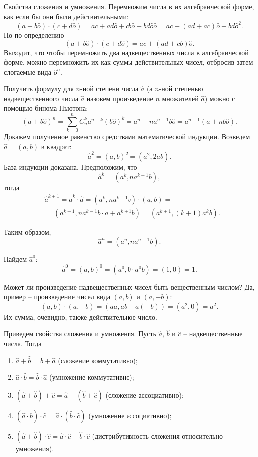 \b{Свойства сложения и умножения.} Перемножим числа в их алгебраической форме, как если бы они были действительными:
	$$(a+b\hat{o})\cdot(c+d\hat{o})=ac+ad\hat{o}+cb\hat{o}+bd\hat{o}\hat{o}=ac+(ad+ac)\hat{o}+bd\hat{o}^2.$$
Но по определению
	$$(a+b\hat{o})\cdot(c+d\hat{o})=ac+(ad+cb)\hat{o}.$$
Выходит, что чтобы перемножить два надвещественных числа в алгебраической форме, можно перемножить их как суммы действительных чисел, отбросив затем слогаемые вида $\hat{o}^n$.
\begin{example} Получить формулу для $n$-ной степени числа $\hat{a}$  (а $n$-ной степенью надвещественного числа $\hat{a}$ назовем произведение $n$ множителей $\hat{a}$) можно с помощью бинома Ньютона:
	$$(a+b\hat{o})^n=\sum_{k=0}^n C_n^k a^{n-k} (b\hat{o})^k=a^n+na^{n-1}b\hat{o}=a^{n-1}(a+nb\hat{o}).$$
Докажем полученное равенство средствами математической индукции. Возведем $\hat{a}=(a, b)$ в квадрат:
	$$\hat{a}^2=(a, b)^2=(a^2, 2ab).$$
База индукции доказана. Предположим, что
	$$\hat{a}^k=(a^k, na^{k-1}b),$$
тогда
	\begin{eqnarray*}
	& \hat{a}^{k+1}=\hat{a}^k\cdot\hat{a}=(a^k, na^{k-1}b)\cdot(a, b)= \\
	& = (a^{k+1}, na^{k-1}b\cdot a+a^{k+1}b)=(a^{k+1}, (k+1)a^kb).
	\end{eqnarray*}
\end{example}
Таким образом,
\begin{equation}\label{eq:npower}
	\hat{a}^n=(a^n, na^{n-1}b).
\end{equation}
\begin{example}
	Найдем $\hat{a}^0$:
		$$\hat{a}^0=(a, b)^0=(a^0, 0\cdot a^0b)=(1, 0)=1.$$
\end{example}
\begin{example} Может ли произведение надвещественных чисел быть вещественным числом? Да, пример -- произведение чисел вида $(a, b)$ и $(a, -b)$:
	$$(a, b)\cdot(a, -b)=(aa, ab+a(-b))=(a^2, 0)=a^2.$$
Их сумма, очевидно, также действительное число.
\end{example}
Приведем свойства сложения и умножения. Пусть $\hat{a}$, $\hat{b}$ и $\hat{c}$ -- надвещественные числа. Тогда
\begin{enumerate}
	\item $\hat{a}+\hat{b}=\hat{b}+\hat{a}$ (сложение коммутативно); 
	\item $\hat{a}\cdot\hat{b}=\hat{b}\cdot\hat{a}$ (умножение коммутативно); 
	\item $(\hat{a}+\hat{b})+\hat{c}=\hat{a}+(\hat{b}+\hat{c})$ (сложение ассоциативно); 
	\item $(\hat{a}\cdot\hat{b})\cdot\hat{c}=\hat{a}\cdot(\hat{b}\cdot\hat{c})$ (умножение ассоциативно);
	\item $(\hat{a}+\hat{b})\cdot\hat{c}=\hat{a}\cdot\hat{c}+\hat{b}\cdot\hat{c}$ (дистрибутивность сложения относительно умножения).
\end{enumerate}
